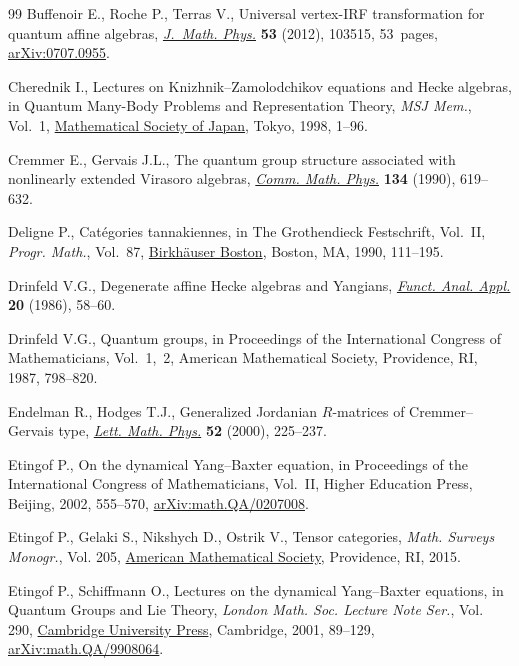 \documentclass[pdftex]{sigma}
\numberwithin{equation}{section}
\begin{document}
\begin{thebibliography}{99}
Buffenoir E., Roche P., Terras V., Universal vertex-{IRF} transformation for
 quantum affine algebras, \href{https://doi.org/10.1063/1.4754699}{\textit{J.~Math. Phys.}} \textbf{53} (2012), 103515,
 53~pages, \href{https://arxiv.org/abs/0707.0955}{arXiv:0707.0955}.

Cherednik I., Lectures on {K}nizhnik--{Z}amolodchikov equations and {H}ecke
 algebras, in Quantum {M}any-{B}ody {P}roblems and {R}epresentation {T}heory,
 \textit{MSJ Mem.}, Vol.~1, \href{https://doi.org/10.2969/msjmemoirs/00101C010}{Mathematical Society of Japan}, Tokyo, 1998, 1--96.

Cremmer E., Gervais J.L., The quantum group structure associated with
 nonlinearly extended {V}irasoro algebras, \href{https://doi.org/10.1007/BF02098449}{\textit{Comm. Math. Phys.}}
 \textbf{134} (1990), 619--632.

Deligne P., Cat\'egories tannakiennes, in The {G}rothendieck {F}estschrift,
 {V}ol.~{II}, \textit{Progr. Math.}, Vol.~87, \href{https://doi.org/10.1007/978-0-8176-4575-5_3}{Birkh\"auser Boston}, Boston, MA,
 1990, 111--195.

Drinfeld V.G., Degenerate affine {H}ecke algebras and {Y}angians,
 \href{https://doi.org/10.1007/BF01077318}{\textit{Funct. Anal. Appl.}} \textbf{20} (1986), 58--60.

Drinfeld V.G., Quantum groups, in Proceedings of the {I}nternational {C}ongress
 of {M}athematicians, {V}ol.~1,~2, American Mathematical Society, Providence,
 RI, 1987, 798--820.

Endelman R., Hodges T.J., Generalized {J}ordanian {$R$}-matrices of
 {C}remmer--{G}ervais type, \href{https://doi.org/10.1023/A:1007693603336}{\textit{Lett. Math. Phys.}} \textbf{52} (2000),
 225--237.

Etingof P., On the dynamical {Y}ang--{B}axter equation, in Proceedings of the
 {I}nternational {C}ongress of {M}athematicians, {V}ol.~{II}, Higher Education
 Press, Beijing, 2002, 555--570, \href{https://arxiv.org/abs/math.QA/0207008}{arXiv:math.QA/0207008}.

Etingof P., Gelaki S., Nikshych D., Ostrik V., Tensor categories, \textit{Math.
 Surveys Monogr.}, Vol. 205, \href{https://doi.org/10.1090/surv/205}{American Mathematical Society}, Providence, RI,
 2015.

Etingof P., Schiffmann O., Lectures on the dynamical {Y}ang--{B}axter
 equations, in Quantum {G}roups and {L}ie {T}heory, \textit{London Math. Soc.
 Lecture Note Ser.}, Vol. 290, \href{https://doi.org/10.1017/CBO9780511542848.007}{Cambridge University Press}, Cambridge, 2001,
 89--129, \href{https://arxiv.org/abs/math.QA/9908064}{arXiv:math.QA/9908064}.


\end{thebibliography}
\end{document}
